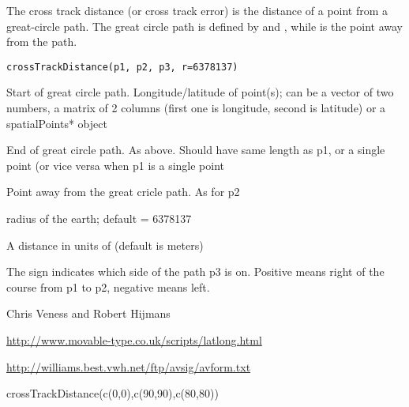 \begin{Description}\relax
The cross track distance (or cross track error) is the distance of a point from a great-circle path. The great circle path is defined by  and , while  is the point away from the path.
\end{Description}
\begin{Usage}
\begin{verbatim}
crossTrackDistance(p1, p2, p3, r=6378137)
\end{verbatim}
\end{Usage}
\begin{Arguments}
\begin{ldescription}
\item[\code{p1}] Start of great circle path. Longitude/latitude of point(s); can be a vector of two numbers, a matrix of 2 columns (first one is longitude, second is latitude) or a spatialPoints* object
\item[\code{p2}] End of great circle path. As above. Should have same length as p1, or a single point (or vice versa when p1 is a single point
\item[\code{p3}] Point away from the great cricle path. As for p2
\item[\code{r}] radius of the earth; default = 6378137
\end{ldescription}
\end{Arguments}
\begin{Value}
A distance in units of  (default is meters)

The sign indicates which side of the path p3 is on. Positive  means right of the course from p1 to p2, negative means left.
\end{Value}
\begin{Author}\relax
Chris Veness and Robert Hijmans
\end{Author}
\begin{References}\relax
\url{http://www.movable-type.co.uk/scripts/latlong.html}

\url{http://williams.best.vwh.net/ftp/avsig/avform.txt}
\end{References}
\begin{SeeAlso}\relax
{}
\end{SeeAlso}
\begin{Examples}
\begin{ExampleCode}
crossTrackDistance(c(0,0),c(90,90),c(80,80))
\end{ExampleCode}
\end{Examples}

